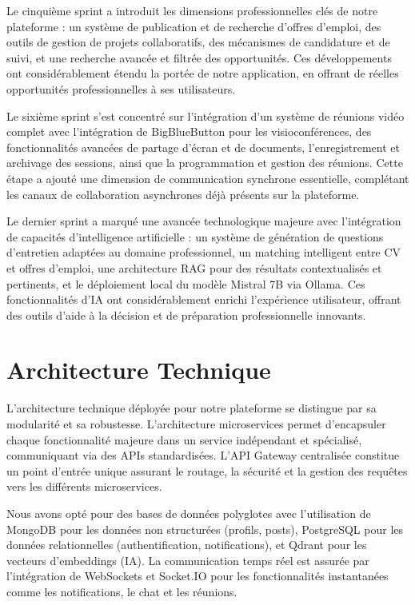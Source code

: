 Le cinquième sprint a introduit les dimensions professionnelles clés de notre plateforme : un système de publication et de recherche d'offres d'emploi, des outils de gestion de projets collaboratifs, des mécanismes de candidature et de suivi, et une recherche avancée et filtrée des opportunités. Ces développements ont considérablement étendu la portée de notre application, en offrant de réelles opportunités professionnelles à ses utilisateurs.

Le sixième sprint s'est concentré sur l'intégration d'un système de réunions vidéo complet avec l'intégration de BigBlueButton pour les visioconférences, des fonctionnalités avancées de partage d'écran et de documents, l'enregistrement et archivage des sessions, ainsi que la programmation et gestion des réunions. Cette étape a ajouté une dimension de communication synchrone essentielle, complétant les canaux de collaboration asynchrones déjà présents sur la plateforme.

Le dernier sprint a marqué une avancée technologique majeure avec l'intégration de capacités d'intelligence artificielle : un système de génération de questions d'entretien adaptées au domaine professionnel, un matching intelligent entre CV et offres d'emploi, une architecture RAG pour des résultats contextualisés et pertinents, et le déploiement local du modèle Mistral 7B via Ollama. Ces fonctionnalités d'IA ont considérablement enrichi l'expérience utilisateur, offrant des outils d'aide à la décision et de préparation professionnelle innovants.

\section{Architecture Technique}
L'architecture technique déployée pour notre plateforme se distingue par sa modularité et sa robustesse. L'architecture microservices permet d'encapsuler chaque fonctionnalité majeure dans un service indépendant et spécialisé, communiquant via des APIs standardisées. L'API Gateway centralisée constitue un point d'entrée unique assurant le routage, la sécurité et la gestion des requêtes vers les différents microservices.

Nous avons opté pour des bases de données polyglotes avec l'utilisation de MongoDB pour les données non structurées (profils, posts), PostgreSQL pour les données relationnelles (authentification, notifications), et Qdrant pour les vecteurs d'embeddings (IA). La communication temps réel est assurée par l'intégration de WebSockets et Socket.IO pour les fonctionnalités instantanées comme les notifications, le chat et les réunions.

